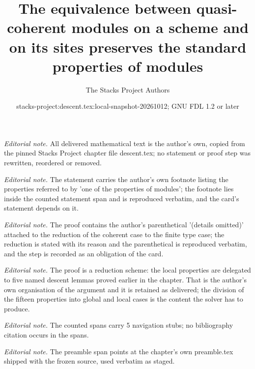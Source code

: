 \documentclass{stacks-project}
\title{The equivalence between quasi-coherent modules on a scheme and on its sites preserves the standard properties of modules}
\author{The Stacks Project Authors}
\date{stacks-project:descent.tex:local-snapshot-20261012; GNU FDL 1.2 or later}
\theoremstyle{plain}
\theoremstyle{definition}
\theoremstyle{remark}
\numberwithin{equation}{subsection}
\begin{document}
\maketitle
\noindent\textit{Editorial note.} All delivered mathematical text is the author's own, copied from the pinned Stacks Project chapter file descent.tex; no statement or proof step was rewritten, reordered or removed.\par\medskip
\noindent\textit{Editorial note.} The statement carries the author's own footnote listing the properties referred to by 'one of the properties of modules'; the footnote lies inside the counted statement span and is reproduced verbatim, and the card's statement depends on it.\par\medskip
\noindent\textit{Editorial note.} The proof contains the author's parenthetical '(details omitted)' attached to the reduction of the coherent case to the finite type case; the reduction is stated with its reason and the parenthetical is reproduced verbatim, and the step is recorded as an obligation of the card.\par\medskip
\noindent\textit{Editorial note.} The proof is a reduction scheme: the local properties are delegated to five named descent lemmas proved earlier in the chapter. That is the author's own organisation of the argument and it is retained as delivered; the division of the fifteen properties into global and local cases is the content the solver has to produce.\par\medskip
\noindent\textit{Editorial note.} The counted spans carry 5 navigation stubs; no bibliography citation occurs in the spans.\par\medskip
\noindent\textit{Editorial note.} The preamble span points at the chapter's own preamble.tex shipped with the frozen source, used verbatim as staged.\par\medskip
\end{document}
